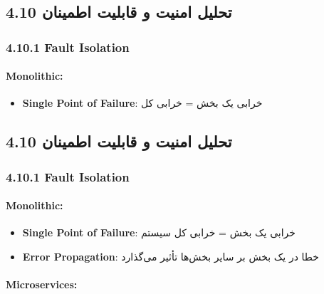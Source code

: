 \documentclass[
]{article}
\providecommand{\tightlist}{%
  \setlength{\itemsep}{0pt}\setlength{\parskip}{0pt}}
\begin{document}
\subsection{4.10 تحلیل امنیت و قابلیت
اطمینان}\label{ux62aux62dux644ux6ccux644-ux627ux645ux646ux6ccux62a-ux648-ux642ux627ux628ux644ux6ccux62a-ux627ux637ux645ux6ccux646ux627ux646}

\subsubsection{4.10.1 Fault Isolation}\label{fault-isolation}

\paragraph{Monolithic:}\label{monolithic}

\begin{itemize}
\tightlist
\item
  \textbf{Single Point of Failure}: خرابی یک بخش = خرابی کل
\end{itemize}

\subsection{4.10 تحلیل امنیت و قابلیت
اطمینان}\label{ux62aux62dux644ux6ccux644-ux627ux645ux646ux6ccux62a-ux648-ux642ux627ux628ux644ux6ccux62a-ux627ux637ux645ux6ccux646ux627ux646-1}

\subsubsection{4.10.1 Fault Isolation}\label{fault-isolation-1}

\paragraph{Monolithic:}\label{monolithic-1}

\begin{itemize}
\tightlist
\item
  \textbf{Single Point of Failure}: خرابی یک بخش = خرابی کل سیستم
\item
  \textbf{Error Propagation}: خطا در یک بخش بر سایر بخش‌ها تأثیر می‌گذارد
\end{itemize}

\paragraph{Microservices:}\label{microservices}
\end{document}

